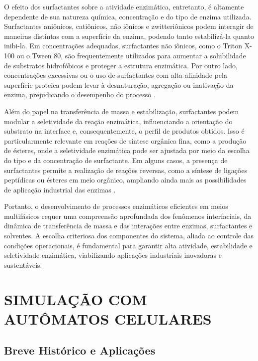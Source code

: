 \documentclass[12pt,oneside]{report}
\begin{document}
O efeito dos surfactantes sobre a atividade enzimática, entretanto, é altamente dependente de sua natureza química, concentração e do tipo de enzima utilizada. Surfactantes aniônicos, catiônicos, não iônicos e zwitteriônicos podem interagir de maneiras distintas com a superfície da enzima, podendo tanto estabilizá-la quanto inibi-la. Em concentrações adequadas, surfactantes não iônicos, como o Triton X-100 ou o Tween 80, são frequentemente utilizados para aumentar a solubilidade de substratos hidrofóbicos e proteger a estrutura enzimática. Por outro lado, concentrações excessivas ou o uso de surfactantes com alta afinidade pela superfície proteica podem levar à desnaturação, agregação ou inativação da enzima, prejudicando o desempenho do processo \cite{lau2010surfactants}.

Além do papel na transferência de massa e estabilização, surfactantes podem modular a seletividade da reação enzimática, influenciando a orientação do substrato na interface e, consequentemente, o perfil de produtos obtidos. Isso é particularmente relevante em reações de síntese orgânica fina, como a produção de ésteres, onde a seletividade enzimática pode ser ajustada por meio da escolha do tipo e da concentração de surfactante. Em alguns casos, a presença de surfactantes permite a realização de reações reversas, como a síntese de ligações peptídicas ou ésteres em meio orgânico, ampliando ainda mais as possibilidades de aplicação industrial das enzimas \cite{lau2010surfactants}.

Portanto, o desenvolvimento de processos enzimáticos eficientes em meios multifásicos requer uma compreensão aprofundada dos fenômenos interfaciais, da dinâmica de transferência de massa e das interações entre enzimas, surfactantes e solventes. A escolha criteriosa dos componentes do sistema, aliada ao controle das condições operacionais, é fundamental para garantir alta atividade, estabilidade e seletividade enzimática, viabilizando aplicações industriais inovadoras e sustentáveis.

\section{SIMULAÇÃO COM AUTÔMATOS CELULARES}

\subsection{Breve Histórico e Aplicações}
\end{document}
